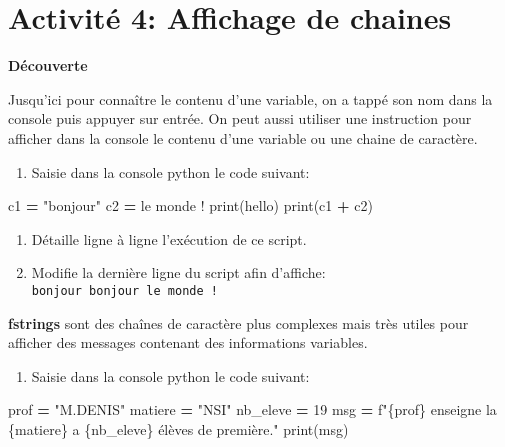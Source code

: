 \documentclass[
]{book}
\newenvironment{Shaded}{\begin{snugshade}}{\end{snugshade}}
\newcommand{\BuiltInTok}[1]{#1}
\newcommand{\DecValTok}[1]{\textcolor[rgb]{0.00,0.00,0.81}{#1}}
\newcommand{\NormalTok}[1]{#1}
\newcommand{\OperatorTok}[1]{\textcolor[rgb]{0.81,0.36,0.00}{\textbf{#1}}}
\newcommand{\SpecialCharTok}[1]{\textcolor[rgb]{0.00,0.00,0.00}{#1}}
\newcommand{\SpecialStringTok}[1]{\textcolor[rgb]{0.31,0.60,0.02}{#1}}
\newcommand{\StringTok}[1]{\textcolor[rgb]{0.31,0.60,0.02}{#1}}
\providecommand{\tightlist}{%
  \setlength{\itemsep}{0pt}\setlength{\parskip}{0pt}}
\def\tightlist{}
\begin{document}
\hypertarget{activituxe9-4-affichage-de-chaines}{%
\section{Activité 4: Affichage de chaines}\label{activituxe9-4-affichage-de-chaines}}

\textbf{Découverte}

Jusqu'ici pour connaître le contenu d'une variable, on a tappé son nom dans la console puis appuyer sur entrée. On peut aussi utiliser une instruction pour afficher dans la console le contenu d'une variable ou une chaine de caractère.

\begin{enumerate}
\def\labelenumi{\arabic{enumi}.}
\tightlist
\item
  Saisie dans la console python le code suivant:
\end{enumerate}

\begin{Shaded}
\begin{Highlighting}[]
\NormalTok{c1 }\OperatorTok{=} \StringTok{"bonjour"}
\NormalTok{c2 }\OperatorTok{=} \StringTok{\textquotesingle{} le monde !\textquotesingle{}}
\BuiltInTok{print}\NormalTok{(}\StringTok{\textquotesingle{}hello\textquotesingle{}}\NormalTok{)}
\BuiltInTok{print}\NormalTok{(c1 }\OperatorTok{+}\NormalTok{ c2)}
\end{Highlighting}
\end{Shaded}

\begin{enumerate}
\def\labelenumi{\arabic{enumi}.}
\setcounter{enumi}{1}
\tightlist
\item
  Détaille ligne à ligne l'exécution de ce script.
\item
  Modifie la dernière ligne du script afin d'affiche: \texttt{bonjour\ bonjour\ le\ monde\ !}
\end{enumerate}

\textbf{fstrings} sont des chaînes de caractère plus complexes mais très utiles pour afficher des messages contenant des informations variables.

\begin{enumerate}
\def\labelenumi{\arabic{enumi}.}
\tightlist
\item
  Saisie dans la console python le code suivant:
\end{enumerate}

\begin{Shaded}
\begin{Highlighting}[]
\NormalTok{prof }\OperatorTok{=} \StringTok{"M.DENIS"}
\NormalTok{matiere }\OperatorTok{=} \StringTok{"NSI"}
\NormalTok{nb\_eleve }\OperatorTok{=} \DecValTok{19}
\NormalTok{msg }\OperatorTok{=} \SpecialStringTok{f"}\SpecialCharTok{\{}\NormalTok{prof}\SpecialCharTok{\}}\SpecialStringTok{ enseigne la }\SpecialCharTok{\{}\NormalTok{matiere}\SpecialCharTok{\}}\SpecialStringTok{ a }\SpecialCharTok{\{}\NormalTok{nb\_eleve}\SpecialCharTok{\}}\SpecialStringTok{ élèves de première."}
\BuiltInTok{print}\NormalTok{(msg)}
\end{Highlighting}
\end{Shaded}
\end{document}
